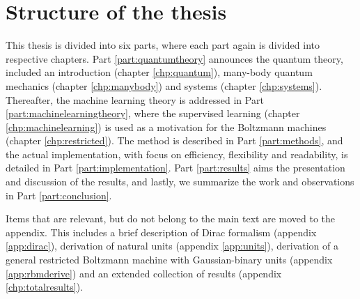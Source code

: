 \section{Structure of the thesis}
This thesis is divided into six parts, where each part again is divided into respective chapters. Part \ref{part:quantumtheory} announces the quantum theory, included an introduction (chapter \ref{chp:quantum}), many-body quantum mechanics (chapter \ref{chp:manybody}) and systems (chapter \ref{chp:systems}). Thereafter, the machine learning theory is addressed in Part \ref{part:machinelearningtheory}, where the supervised learning (chapter \ref{chp:machinelearning}) is used as a motivation for the Boltzmann machines (chapter \ref{chp:restricted}). The method is described in Part \ref{part:methods}, and the actual implementation, with focus on efficiency, flexibility and readability, is detailed in Part \ref{part:implementation}. Part \ref{part:results} aims the presentation and discussion of the results, and lastly, we summarize the work and observations in Part \ref{part:conclusion}. 

Items that are relevant, but do not belong to the main text are moved to the appendix. This includes a brief description of Dirac formalism (appendix \ref{app:dirac}), derivation of natural units (appendix \ref{app:units}), derivation of a general restricted Boltzmann machine with Gaussian-binary units (appendix \ref{app:rbmderive}) and an extended collection of results (appendix \ref{chp:totalresults}).
